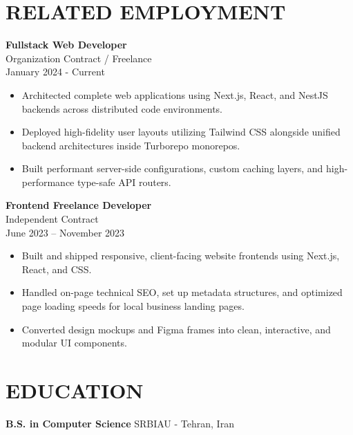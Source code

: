 \documentclass[a4paper,9pt]{extarticle}
\begin{document}
	\section*{RELATED EMPLOYMENT}
	\noindent
	\textbf{Fullstack Web Developer} \\
	 Organization Contract / Freelance  \\
	January 2024 - Current
	\begin{itemize}[leftmargin=*]
		\item Architected complete web applications using Next.js, React, and NestJS backends across distributed code environments.
		\item Deployed high-fidelity user layouts utilizing Tailwind CSS alongside unified backend architectures inside Turborepo monorepos.
		\item Built performant server-side configurations, custom caching layers, and high-performance type-safe API routers.
	\end{itemize}
	\noindent
	
	\vspace*{6pt}
	\noindent
	\textbf{Frontend Freelance Developer} \\
	Independent Contract \\
	June 2023 -- November 2023
	\begin{itemize}[leftmargin=*]
		\item Built and shipped responsive, client-facing website frontends using Next.js, React, and CSS.
		\item Handled on-page technical SEO, set up metadata structures, and optimized page loading speeds for local business landing pages.
		\item Converted design mockups and Figma frames into clean, interactive, and modular UI components.
	\end{itemize}

\section*{EDUCATION}

\noindent
\textbf{B.S. in Computer Science} \hfill SRBIAU - Tehran, Iran \\ 


	
\end{document}
